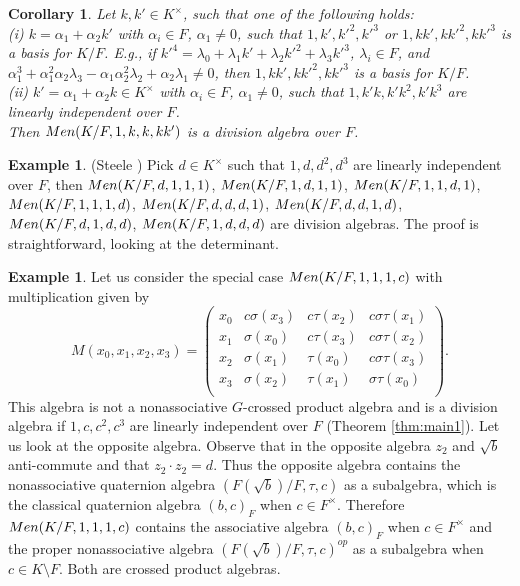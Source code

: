 \documentclass[11pt]{amsart}
\theoremstyle{plain}
\newtheorem{corollary}[theorem]{Corollary}
\theoremstyle{definition}
\newtheorem{example}[theorem]{Example}
\begin{document}
\begin{corollary}
 Let $k,k'\in K^\times$, such that one of the following holds:
 \\
(i) $k=\alpha_1+\alpha_2k'$ with $\alpha_i\in F$, $\alpha_1\not=0$, such that $1,k', k'^2, k'^3$ or $1,kk', kk'^2, kk'^3$  is a basis for $K/F$.
 E.g., if $k'^4 = \lambda_0 + \lambda_1k' + \lambda_2k'^2 + \lambda_3k'^3$, $\lambda_i\in F$, and $\alpha_1^3 +\alpha_1^2\alpha_2 \lambda_3 - \alpha_1\alpha_2^2 \lambda_2 + \alpha_2 \lambda_1 \neq 0$, then $1, kk', kk'^2, kk'^3$ is a basis for $K/F$.
 \\ (ii)  $k'=\alpha_1+\alpha_2k\in K^\times$ with $\alpha_i\in F$, $\alpha_1\not=0$, such that $1,k'k,k'k^2,k'k^{3}$ are linearly independent over $F$.
 \\ Then ${\rm Men}(K/F,1,k,k,kk')$ is a division algebra  over $F$.
\end{corollary}


\begin{example}\label{4x4Ex2} (Steele \cite{ST})
Pick $d \in K^\times$ such that $1, d, d^2, d^3$ are linearly independent over $F$, then  ${\rm Men}(K/F, d,1,1,1)$,
 ${\rm Men}(K/F, 1,d,1,1)$,
 ${\rm Men}(K/F, 1,1,d,1)$,
 ${\rm Men}(K/F, 1,1,1,d)$,
 ${\rm Men}(K/F, d,d,d,1)$,
 ${\rm Men}(K/F, d,d,1,d)$,
 ${\rm Men}(K/F, d,1,d,d)$,
 ${\rm Men}(K/F, 1,d,d,d)$ are division algebras.
The proof is straightforward, looking at the determinant.
\end{example}

\begin{example}\label{ex:Me}
Let us consider the special case  ${\rm Men}(K/F,1,1,1,c)$ with  multiplication  given by
\[M(x_0, x_1, x_2, x_3)=
\left( \begin{array}{cccc}
x_0 &  c\sigma(x_{3}) & c\tau(x_{2}) & c \sigma \tau(x_{1})\\
x_1 & \sigma(x_0)       & c \tau(x_{3})  &  c \sigma \tau(x_{2})\\
x_2 & \sigma(x_{1})    & \tau(x_0)       & c \sigma \tau(x_{3})\\
x_3 &  \sigma(x_{2})   &  \tau(x_1)      &  \sigma \tau(x_{0}) \\
\end {array}\right).
 \]
 This algebra is not a nonassociative $G$-crossed product algebra and is  a division algebra if $1,c,c^2,c^3$ are linearly independent over $F$ (Theorem \ref{thm:main1}). Let us look at the opposite algebra.  Observe that in the opposite algebra
 $z_2$ and $\sqrt{b}$ anti-commute and that  $z_2\cdot z_2 = d$. Thus the opposite algebra contains the nonassociative quaternion algebra $(F(\sqrt{b})/F, \tau, c)$  as a subalgebra, which is the classical quaternion algebra $(b,c)_F$ when $c\in F^\times$. Therefore
 ${\rm Men}(K/F,1,1,1,c)$ contains the associative algebra $(b,c)_F$ when $c\in F^\times$ and the proper nonassociative algebra $(F(\sqrt{b})/F, \tau, c)^{op}$  as a subalgebra when $c\in K\setminus F$. Both are crossed product algebras.
\end{example}
\end{document}
